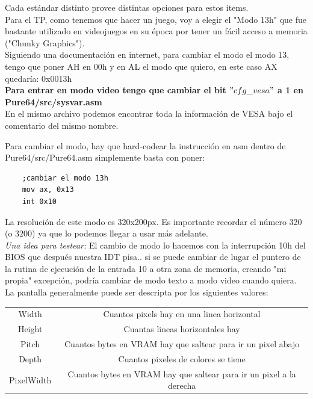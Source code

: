 \documentclass[]{article}
\begin{document}
Cada est\'andar distinto provee distintas opciones para estos items.\\

Para el TP, como tenemos que hacer un juego, voy a elegir el "Modo 13h" que fue bastante utilizado en videojuegos en su \'epoca por tener un f\'acil acceso a memoria ("Chunky Graphics").\\

Siguiendo una documentaci\'on en internet, para cambiar el modo el modo 13, tengo que poner AH en 00h y en AL el modo que quiero, en este caso AX quedar\'ia: 0x0013h\\

\textbf{Para entrar en modo video tengo que cambiar el bit $"cfg\_vesa"$ a 1 en Pure64/src/sysvar.asm}\\

En el mismo archivo podemos encontrar toda la informaci\'on de VESA bajo el comentario del mismo nombre.

Para cambiar el modo, hay que hard-codear la instrucci\'on en asm dentro de Pure64/src/Pure64.asm simplemente basta con poner:

\begin{lstlisting}
	;cambiar el modo 13h
	mov ax, 0x13
	int 0x10
\end{lstlisting}

La resoluci\'on de este modo es 320x200px. Es importante recordar el n\'umero 320 (o 3200) ya que lo podemos llegar a usar m\'as adelante.\\

\textit{Una idea para testear:} El cambio de modo lo hacemos con la interrupci\'on 10h del BIOS que despu\'es nuestra IDT pisa.. si se puede cambiar de lugar el puntero de la rutina de ejecuci\'on de la entrada 10 a otra zona de memoria, creando "mi propia" excepci\'on, podr\'ia cambiar de modo texto a modo video cuando quiera.\\

La pantalla generalmente puede ser descripta por los siguientes valores:\\

\begin{tabular}{ |c|c|}
	\hline
	Width & Cuantos pixels hay en una linea horizontal\\
	Height & Cuantas lineas horizontales hay\\
	Pitch & Cuantos bytes en VRAM hay que saltear para ir un pixel abajo\\
	Depth & Cuantos pixeles de colores se tiene\\
	PixelWidth &  Cuantos bytes en VRAM hay que saltear para ir un pixel a la derecha\\
	\hline
\end{tabular}
\end{document}
